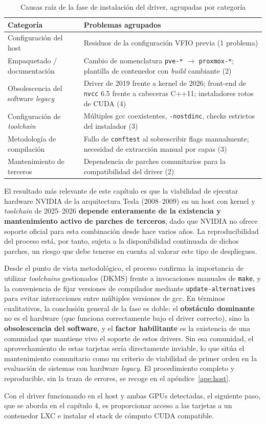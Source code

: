 \begin{table}[H]
\centering
\small
\setlength{\tabcolsep}{4pt}
\begin{tabular}{|L{4.0cm}|L{7.8cm}|}
\hline
\textbf{Categoría} & \textbf{Problemas agrupados} \\
\hline
Configuración del host & Residuos de la configuración VFIO previa (1 problema) \\
\hline
Empaquetado / documentación & Cambio de nomenclatura \texttt{pve-*} $\rightarrow$ \texttt{proxmox-*}; plantilla de contenedor con \textit{build} cambiante (2) \\
\hline
Obsolescencia del software \textit{legacy} & Driver de 2019 frente a kernel de 2026; front-end de \texttt{nvcc} 6.5 frente a cabeceras C++11; instaladores rotos de CUDA (4) \\
\hline
Configuración de \textit{toolchain} & Múltiples gcc coexistentes, \texttt{-nostdinc}, checks estrictos del instalador (3) \\
\hline
Metodología de compilación & Fallo de \texttt{conftest} al sobrescribir flags manualmente; necesidad de extracción manual por capas (3) \\
\hline
Mantenimiento de terceros & Dependencia de parches comunitarios para la compatibilidad del driver (2) \\
\hline
\end{tabular}
\caption{Causas raíz de la fase de instalación del driver, agrupadas por categoría}
\label{tab:causas-resumen}
\end{table}

El resultado más relevante de este capítulo es que la viabilidad de ejecutar hardware NVIDIA de la arquitectura Tesla (2008--2009) en un host con kernel y \textit{toolchain} de 2025--2026 \textbf{depende enteramente de la existencia y mantenimiento activo de parches de terceros}, dado que NVIDIA no ofrece soporte oficial para esta combinación desde hace varios años. La reproducibilidad del proceso está, por tanto, sujeta a la disponibilidad continuada de dichos parches, un riesgo que debe tenerse en cuenta al valorar este tipo de despliegues.

Desde el punto de vista metodológico, el proceso confirma la importancia de utilizar \textit{toolchains} gestionados (DKMS) frente a invocaciones manuales de \texttt{make}, y la conveniencia de fijar versiones de compilador mediante \texttt{update-alternatives} para evitar interacciones entre múltiples versiones de gcc. En términos cualitativos, la conclusión general de la fase es doble: el \textbf{obstáculo dominante} no es el hardware (que funciona correctamente bajo el driver correcto), sino la \textbf{obsolescencia del software}, y el \textbf{factor habilitante} es la existencia de una comunidad que mantiene vivo el soporte de estos drivers. Sin esa comunidad, el aprovechamiento de estas tarjetas sería directamente inviable, lo que sitúa el mantenimiento comunitario como un criterio de viabilidad de primer orden en la evaluación de sistemas con hardware \textit{legacy}. El procedimiento completo y reproducible, sin la traza de errores, se recoge en el apéndice~\ref{ape:host}.

Con el driver funcionando en el host y ambas GPUs detectadas, el siguiente paso, que se aborda en el capítulo 4, es proporcionar acceso a las tarjetas a un contenedor LXC e instalar el stack de cómputo CUDA compatible.

